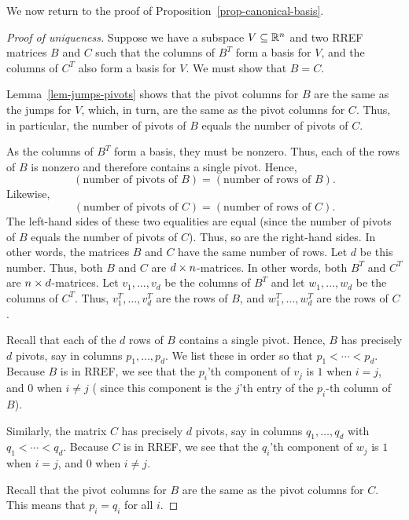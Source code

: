\documentclass[reqno]{amsart}
\theoremstyle{definition}
\begin{document}
We now return to the proof of Proposition~\ref{prop-canonical-basis}.
\begin{proof}[Proof of uniqueness]
 Suppose we have a subspace $V\subseteq{\mathbb{R}}^n$ and two RREF matrices $B$ and
 $C$ such that the columns of $B^T$ form a basis for $V$, and the
 columns of $C^T$ also form a basis for $V$.  We must show that $B=C$.
 
 Lemma~\ref{lem-jumps-pivots} shows that the pivot
 columns for $B$ are the same as the jumps for $V$, which, in turn,
 are the same as the pivot columns for $C$.
 Thus, in particular, the number of pivots of $B$ equals the number
 of pivots of $C$.

 As the columns of $B^T$ form a basis, they must be nonzero. Thus,
 each of the rows of $B$ is nonzero and therefore contains a single
 pivot.
 Hence,
 \[
 \left(\text{number of pivots of $B$}\right)
 = \left(\text{number of rows of $B$}\right).
 \]
 Likewise,
 \[
 \left(\text{number of pivots of $C$}\right)
 = \left(\text{number of rows of $C$}\right).
 \]
 The left-hand sides of these two equalities are equal (since the
 number of pivots of $B$ equals the number of pivots of $C$).
 Thus, so are the right-hand sides.
 In other words, the matrices $B$ and $C$ have the same number of rows.
 Let $d$ be this number.
 Thus, both $B$ and $C$ are $d\times n$-matrices.
 In other words, both $B^T$ and $C^T$ are $n\times d$-matrices.
 Let $v_1,\dotsc,v_d$ be the columns
 of $B^T$ and let $w_1,\dotsc,w_d$ be the columns of $C^T$.
 Thus, $v_1^T, \dotsc, v_d^T$ are the rows of $B$,
 and $w_1^T, \dots, w_d^T$ are the rows of $C$.

 Recall that each of the $d$ rows of $B$ contains a single
 pivot.
 Hence, $B$ has precisely $d$ pivots, say
 in columns $p_1,\dotsc,p_d$.  We list these in order so that
 $p_1<\dotsb<p_d$.
 Because $B$ is in RREF, we see that the $p_i$'th component of $v_j$
 is $1$ when $i=j$, and $0$ when $i\neq j$
 (%
 since this component is the
 $j$'th entry of the $p_i$-th column of $B$).

 Similarly, the matrix $C$ has precisely $d$ pivots, say in
 columns $q_1,\dotsc,q_d$ with $q_1<\dotsb<q_d$.  Because $C$ is in
 RREF, we see that the $q_i$'th component of $w_j$ is $1$ when $i=j$,
 and $0$ when $i\neq j$.

 Recall that the pivot columns for $B$ are the same as
 the pivot columns for $C$.  This means that $p_i=q_i$ for all $i$.


\end{proof}
\end{document}
